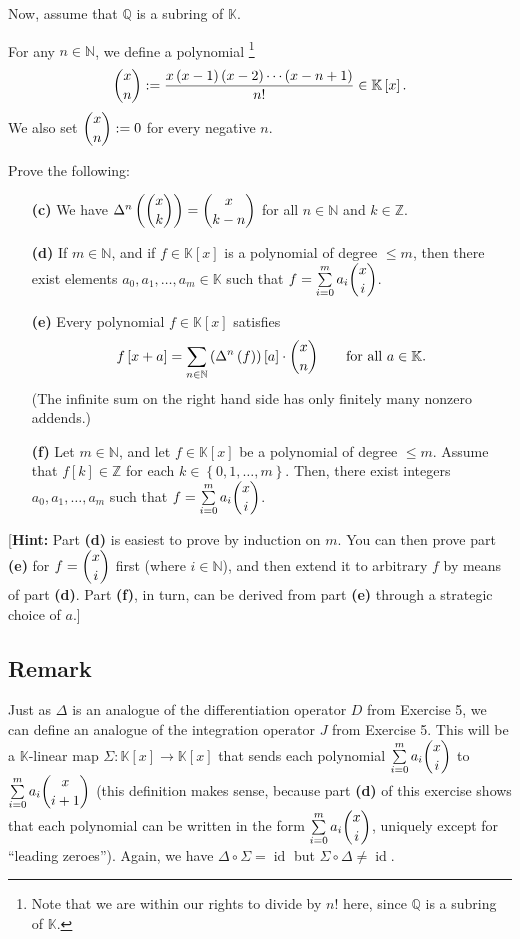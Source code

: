 \documentclass[paper=a4, fontsize=12pt]{scrartcl} %
\newcommand{\QQ}{\mathbb{Q}} %
\newcommand{\NN}{\mathbb{N}} %
\newcommand{\KK}{\mathbb{K}} %
\newcommand{\ZZ}{\mathbb{Z}} %
\newcommand{\id}{\operatorname{id}} %
\newcommand{\set}[1]{\left\{ #1 \right\}}
\newcommand{\tup}[1]{\left( #1 \right)}
\newcommand{\ive}[1]{\left[ #1 \right]}
\let\sumnonlimits\sum
\renewcommand{\sum}{\sumnonlimits\limits}
\theoremstyle{plainsl}
\theoremstyle{definition}
\theoremstyle{remark}
\begin{document}
Now, assume that $\QQ$ is a subring of $\KK$.

For any $n \in \NN$, we define a polynomial%
\footnote{Note that we are within our rights to divide
by $n!$ here, since $\QQ$ is a subring of $\KK$.}
\[
\dbinom{x}{n} := \dfrac{x\tup{x-1}\tup{x-2}\cdots\tup{x-n+1}}{n!}
\in \KK\ive{x} .
\]
We also set $\dbinom{x}{n} := 0$ for every negative $n$.

Prove the following:

\begin{enumerate}

\item[\textbf{(c)}]
We have $\Delta^n \tup{\dbinom{x}{k}} = \dbinom{x}{k-n}$
for all $n \in \NN$ and $k \in \ZZ$.

\item[\textbf{(d)}]
If $m \in \NN$, and if $f \in \KK\ive{x}$ is a polynomial
of degree $\leq m$,
then there exist elements $a_0, a_1, \ldots, a_m \in \KK$
such that $f = \sum_{i=0}^m a_i \dbinom{x}{i}$.

\item[\textbf{(e)}]
Every polynomial $f \in \KK\ive{x}$ satisfies
\[
f \ive{x+a} = \sum_{n \in \NN} \tup{\Delta^n \tup{f}} \ive{a} \cdot \dbinom{x}{n}
\qquad \text{for all $a \in \KK$} .
\]
(The infinite sum on the right hand side has only
finitely many nonzero addends.)

\item[\textbf{(f)}]
Let $m \in \NN$, and let $f \in \KK\ive{x}$ be a polynomial
of degree $\leq m$.
Assume that $f\ive{k} \in \ZZ$ for each $k \in \set{0, 1, \ldots, m}$.
Then, there exist integers $a_0, a_1, \ldots, a_m$
such that $f = \sum_{i=0}^m a_i \dbinom{x}{i}$.

\end{enumerate}

[\textbf{Hint:} Part \textbf{(d)} is easiest to prove by
induction on $m$.
You can then prove part \textbf{(e)} for $f = \dbinom{x}{i}$
first (where $i \in \NN$), and then extend it to arbitrary $f$
by means of part \textbf{(d)}.
Part \textbf{(f)}, in turn, can be derived from part
\textbf{(e)} through a strategic choice of $a$.]

\subsection{Remark}

Just as $\Delta$ is an analogue of the differentiation
operator $D$ from Exercise 5,
we can define an analogue of the integration operator
$J$ from Exercise 5.
This will be a $\KK$-linear map $\Sigma : \KK\ive{x} \to \KK\ive{x}$
that sends each polynomial
$\sum_{i=0}^m a_i \dbinom{x}{i}$ to
$\sum_{i=0}^m a_i \dbinom{x}{i+1}$
(this definition makes sense, because part \textbf{(d)}
of this exercise
shows that each polynomial can be written in the form
$\sum_{i=0}^m a_i \dbinom{x}{i}$, uniquely except for
``leading zeroes'').
Again, we have $\Delta \circ \Sigma = \id$ but
$\Sigma \circ \Delta \neq \id$.
\end{document}
